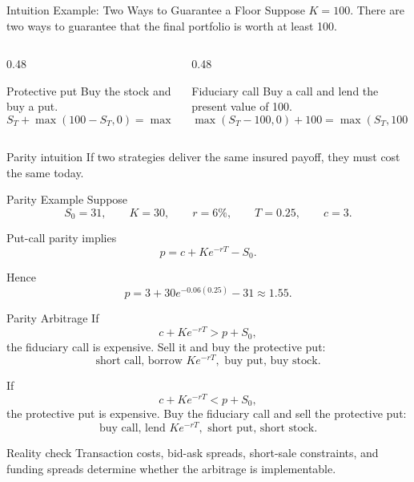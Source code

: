 \documentclass[aspectratio=169,11pt]{beamer}
\begin{document}
\begin{frame}{Intuition Example: Two Ways to Guarantee a Floor}
    Suppose \(K=100\). There are two ways to guarantee that the final portfolio is worth at least 100.

    \begin{columns}[T]
        \begin{column}{0.48\textwidth}
            \begin{block}{Protective put}
                Buy the stock and buy a put.
                \[
                    S_T+\max(100-S_T,0)
                    =
                    \max(S_T,100).
                \]
            \end{block}
        \end{column}
        \begin{column}{0.48\textwidth}
            \begin{block}{Fiduciary call}
                Buy a call and lend the present value of 100.
                \[
                    \max(S_T-100,0)+100
                    =
                    \max(S_T,100).
                \]
            \end{block}
        \end{column}
    \end{columns}

    \begin{alertblock}{Parity intuition}
        If two strategies deliver the same insured payoff, they must cost the same today.
    \end{alertblock}
\end{frame}

\begin{frame}{Parity Example}
    Suppose
    \[
        S_0=31,
        \qquad
        K=30,
        \qquad
        r=6\%,
        \qquad
        T=0.25,
        \qquad
        c=3.
    \]

    Put-call parity implies
    \[
        p=c+Ke^{-rT}-S_0.
    \]

    Hence
    \[
        p=3+30e^{-0.06(0.25)}-31
        \approx 1.55.
    \]
\end{frame}

\begin{frame}{Parity Arbitrage}
    If
    \[
        c+Ke^{-rT}>p+S_0,
    \]
    the fiduciary call is expensive. Sell it and buy the protective put:
    \[
        \text{short call, borrow }Ke^{-rT},\text{ buy put, buy stock}.
    \]

    \vspace{0.6em}
    If
    \[
        c+Ke^{-rT}<p+S_0,
    \]
    the protective put is expensive. Buy the fiduciary call and sell the protective put:
    \[
        \text{buy call, lend }Ke^{-rT},\text{ short put, short stock}.
    \]

    \begin{alertblock}{Reality check}
        Transaction costs, bid-ask spreads, short-sale constraints, and funding spreads determine whether the arbitrage is implementable.
    \end{alertblock}
\end{frame}
\end{document}
